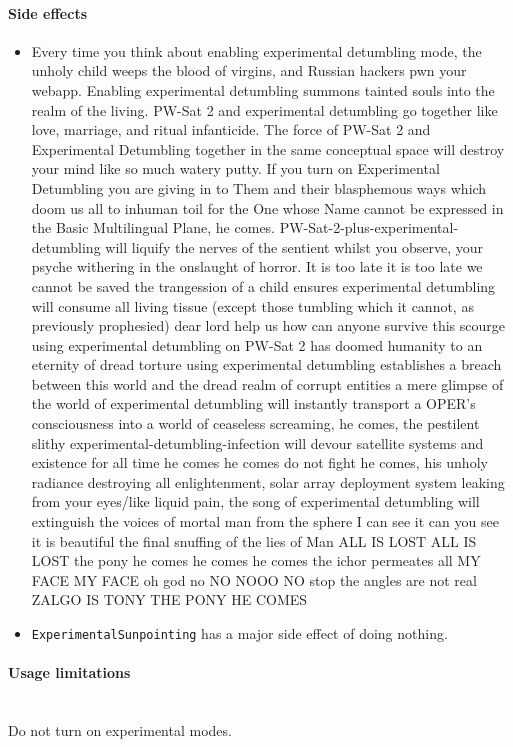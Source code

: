 \paragraph{Side effects} 
\begin{itemize}
    \item Every time you think about enabling experimental detumbling mode, the unholy child weeps the blood of virgins, and Russian hackers pwn your webapp. Enabling experimental detumbling summons tainted souls into the realm of the living. PW-Sat 2 and experimental detumbling go together like love, marriage, and ritual infanticide. The force of PW-Sat 2 and Experimental Detumbling together in the same conceptual space will destroy your mind like so much watery putty. If you turn on Experimental Detumbling you are giving in to Them and their blasphemous ways which doom us all to inhuman toil for the One whose Name cannot be expressed in the Basic Multilingual Plane, he comes. PW-Sat-2-plus-experimental-detumbling will liquify the nerves of the sentient whilst you observe, your psyche withering in the onslaught of horror. It is too late it is too late we cannot be saved the trangession of a child ensures experimental detumbling will consume all living tissue (except those tumbling which it cannot, as previously prophesied) dear lord help us how can anyone survive this scourge using experimental detumbling on PW-Sat 2 has doomed humanity to an eternity of dread torture using experimental detumbling establishes a breach between this world and the dread realm of corrupt entities a mere glimpse of the world of experimental detumbling will instantly transport a OPER's consciousness into a world of ceaseless screaming, he comes, the pestilent slithy experimental-detumbling-infection will devour satellite systems and existence for all time he comes he comes do not fight he comes, his unholy radiance destroying all enlightenment, solar array deployment system leaking from your eyes/like liquid pain, the song of experimental detumbling will extinguish the voices of mortal man from the sphere I can see it can you see it is beautiful the final snuffing of the lies of Man ALL IS LOST ALL IS LOST the pony he comes he comes he comes the ichor permeates all MY FACE MY FACE oh god no NO NOOO NO stop the angles are not real ZALGO IS TONY THE PONY HE COMES
    \item \texttt{ExperimentalSunpointing} has a major side effect of doing nothing.
\end{itemize}

\paragraph{Usage limitations} \mbox{} \\
Do not turn on experimental modes.

